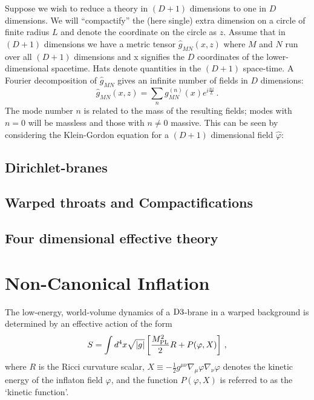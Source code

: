 Suppose we wish to reduce a theory in $(D+1)$ dimensions to one in $D$ dimensions. 
We will ``compactify'' the 
(here single) extra dimension on a circle of finite radius $L$ and denote the coordinate on the circle as $z$. 
Assume that in $(D+1)$ 
dimensions we have a metric tensor $\hat{g}_{MN}(x,z)$ where $M$ and $N$ run over all $(D+1)$ dimensions and 
x signifies the $D$ coordinates of the lower-dimensional spacetime. Hats denote quantities in the $(D+1)$ space-time.
A Fourier decomposition of $\hat{g}_{MN}$ gives an infinite number of fields in $D$ dimensions:
\begin{equation}
 \hat{g}_{MN}(x,z) = \sum_n g_{MN}^{(n)}(x) e^{i\frac{nz}{L}}\,.
\end{equation}
The mode number $n$ is related to the mass of the resulting fields; modes with $n=0$ will be massless and those with
$n \ne 0$ massive. This can be seen by considering the Klein-Gordon equation for a $(D+1)$ dimensional field $\hat{\varphi}$:




\subsection{Dirichlet-branes}
\subsection{Warped throats and Compactifications}
\subsection{Four dimensional effective theory}
% 
% 
\section{Non-Canonical Inflation} 
\label{sec:noncanoninfl}


The low-energy, world-volume dynamics of a 
${\rm D3}$-brane in a warped background is determined 
by an effective action of the form 
% 
\begin{equation}
\label{eq:DBIaction-dbiintro2}
S=\int  d^4x \sqrt{|g|} \left[ \frac{M_{\mathrm{PL}}^2}{2} R 
+ P (\varphi , X) \right] \,,
\end{equation}
% 
where $R$ is the Ricci curvature scalar, 
$X \equiv -\frac{1}{2}g^{\mu \nu}\nabla_\mu \varphi \nabla_\nu \varphi$
denotes the kinetic energy of the inflaton field $\varphi$, and the function  
$P (\varphi , X)$ is referred to as the `kinetic function'.  


